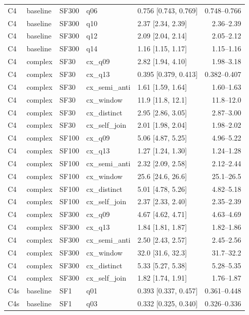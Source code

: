 \begin{longtable}{lllllr}
C4 & baseline & SF300 & q06 & 0.756 [0.743, 0.769] & 0.748--0.766 \\
C4 & baseline & SF300 & q10 & 2.37 [2.34, 2.39] & 2.36--2.39 \\
C4 & baseline & SF300 & q12 & 2.09 [2.04, 2.14] & 2.05--2.12 \\
C4 & baseline & SF300 & q14 & 1.16 [1.15, 1.17] & 1.15--1.16 \\
C4 & complex & SF30 & cx\_q09 & 2.82 [1.94, 4.10] & 1.98--3.18 \\
C4 & complex & SF30 & cx\_q13 & 0.395 [0.379, 0.413] & 0.382--0.407 \\
C4 & complex & SF30 & cx\_semi\_anti & 1.61 [1.59, 1.64] & 1.60--1.63 \\
C4 & complex & SF30 & cx\_window & 11.9 [11.8, 12.1] & 11.8--12.0 \\
C4 & complex & SF30 & cx\_distinct & 2.95 [2.86, 3.05] & 2.87--3.00 \\
C4 & complex & SF30 & cx\_self\_join & 2.01 [1.98, 2.04] & 1.98--2.02 \\
C4 & complex & SF100 & cx\_q09 & 5.06 [4.87, 5.25] & 4.96--5.22 \\
C4 & complex & SF100 & cx\_q13 & 1.27 [1.24, 1.30] & 1.24--1.28 \\
C4 & complex & SF100 & cx\_semi\_anti & 2.32 [2.09, 2.58] & 2.12--2.44 \\
C4 & complex & SF100 & cx\_window & 25.6 [24.6, 26.6] & 25.1--26.5 \\
C4 & complex & SF100 & cx\_distinct & 5.01 [4.78, 5.26] & 4.82--5.18 \\
C4 & complex & SF100 & cx\_self\_join & 2.37 [2.33, 2.40] & 2.35--2.39 \\
C4 & complex & SF300 & cx\_q09 & 4.67 [4.62, 4.71] & 4.63--4.69 \\
C4 & complex & SF300 & cx\_q13 & 1.84 [1.81, 1.87] & 1.82--1.86 \\
C4 & complex & SF300 & cx\_semi\_anti & 2.50 [2.43, 2.57] & 2.45--2.56 \\
C4 & complex & SF300 & cx\_window & 32.0 [31.6, 32.3] & 31.7--32.2 \\
C4 & complex & SF300 & cx\_distinct & 5.33 [5.27, 5.38] & 5.28--5.35 \\
C4 & complex & SF300 & cx\_self\_join & 1.82 [1.74, 1.91] & 1.76--1.87 \\
C4s & baseline & SF1 & q01 & 0.393 [0.337, 0.457] & 0.361--0.448 \\
C4s & baseline & SF1 & q03 & 0.332 [0.325, 0.340] & 0.326--0.336 \\

\end{longtable}
